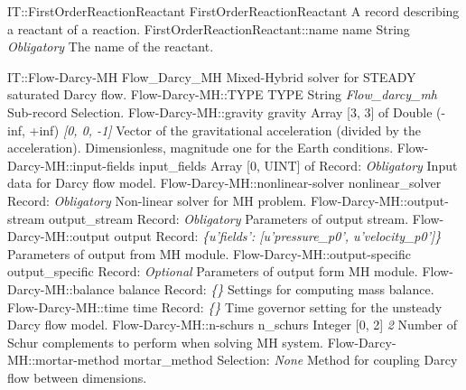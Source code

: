 \begin{RecordType}
	{IT::FirstOrderReactionReactant}
	{FirstOrderReactionReactant}
	{} %
	{} %
	{{{A record describing a reactant of a reaction.}}}
		\RecKey
			{FirstOrderReactionReactant::name}
			{name}
			{{String}}
			{ \it{Obligatory} }
			{{{The name of the reactant.}}}
\end{RecordType}
\begin{RecordType}
	{IT::Flow-Darcy-MH}
	{Flow{\_}Darcy{\_}MH}
	{} %
	{} %
	{{{Mixed-Hybrid  solver for STEADY saturated Darcy flow.}}}
		\RecKey
			{Flow-Darcy-MH::TYPE}
			{TYPE}
			{{String}}
			{ \it{Flow{\_}darcy{\_}mh} }
			{{{Sub-record Selection.}}}
		\RecKey
			{Flow-Darcy-MH::gravity}
			{gravity}
			{{Array [3, 3] of }{Double (-inf, +inf)}}
			{ \it{[0, 0, -1]} }
			{{{Vector of the gravitational acceleration (divided by the acceleration). Dimensionless, magnitude one for the Earth conditions.}}}
		\RecKey
			{Flow-Darcy-MH::input-fields}
			{input{\_}fields}
			{{Array [0, UINT] of }{Record}{: }}
			{ \it{Obligatory} }
			{{{Input data for Darcy flow model.}}}
		\RecKey
			{Flow-Darcy-MH::nonlinear-solver}
			{nonlinear{\_}solver}
			{{Record}{: }}
			{ \it{Obligatory} }
			{{{Non-linear solver for MH problem.}}}
		\RecKey
			{Flow-Darcy-MH::output-stream}
			{output{\_}stream}
			{{Record}{: }}
			{ \it{Obligatory} }
			{{{Parameters of output stream.}}}
		\RecKey
			{Flow-Darcy-MH::output}
			{output}
			{{Record}{: }}
			{ \it{{\{}u'fields': [u'pressure{\_}p0', u'velocity{\_}p0']{\}}} }
			{{{Parameters of output from MH module.}}}
		\RecKey
			{Flow-Darcy-MH::output-specific}
			{output{\_}specific}
			{{Record}{: }}
			{ \it{Optional} }
			{{{Parameters of output form MH module.}}}
		\RecKey
			{Flow-Darcy-MH::balance}
			{balance}
			{{Record}{: }}
			{ \it{{\{}{\}}} }
			{{{Settings for computing mass balance.}}}
		\RecKey
			{Flow-Darcy-MH::time}
			{time}
			{{Record}{: }}
			{ \it{{\{}{\}}} }
			{{{Time governor setting for the unsteady Darcy flow model.}}}
		\RecKey
			{Flow-Darcy-MH::n-schurs}
			{n{\_}schurs}
			{{Integer [0, 2]}}
			{ \it{2} }
			{{{Number of Schur complements to perform when solving MH system.}}}
		\RecKey
			{Flow-Darcy-MH::mortar-method}
			{mortar{\_}method}
			{{Selection}{: }}
			{ \it{None} }
			{{{Method for coupling Darcy flow between dimensions.}}}
\end{RecordType}
